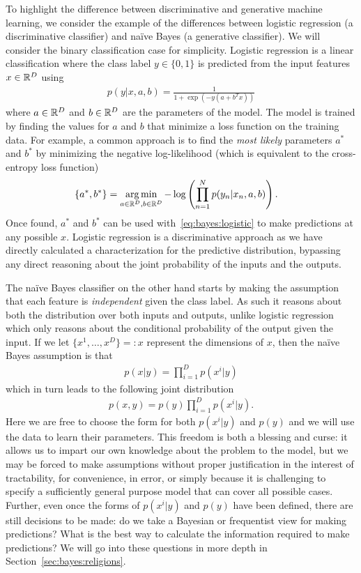 To highlight the difference between discriminative and generative machine learning, we consider the
example of the differences between logistic regression (a discriminative classifier) and na\"{i}ve Bayes 
(a generative classifier).  We will consider the binary classification case for simplicity.  Logistic regression is a linear
classification where the class label $y \in \{0,1\}$ is predicted from the input features $x \in \mathbb{R}^D$ using
\begin{align}
\label{eq:bayes:logistic}
p(y|x,a,b) = \frac{1}{1+\exp(-y(a+b^Tx))}
\end{align}
where $a \in \mathbb{R}^D$ and $b \in \mathbb{R}^D$ are the parameters of the model.  The model is trained by finding the values
for $a$ and $b$ that minimize a loss function on the training data.  For example, a common approach
is to find the \emph{most likely} parameters $a^*$ and $b^*$ by minimizing the negative log-likelihood
(which is equivalent to the cross-entropy loss function)
\begin{align}
\{a^*,b^*\} &= \operatorname*{arg\,min}_{a\in \mathbb{R}^D,b\in \mathbb{R}^D} -\log \left(\prod_{n=1}^{N} p(y_n|x_n,a,b)\right).
\end{align}
Once found, $a^*$ and $b^*$ can be used with~\eqref{eq:bayes:logistic} to make predictions at
any possible $x$.  Logistic regression is a discriminative approach as we have directly calculated
a characterization for the predictive distribution, bypassing any direct reasoning about the joint
probability of the inputs and the outputs.

The na\"{i}ve Bayes classifier on the other hand starts by making the assumption that each feature
is \emph{independent} given the class label.  As such it reasons about both the distribution over both
inputs and outputs, unlike logistic regression which only reasons about the conditional probability
of the output given the input.   If we let $\{x^1,\dots,x^D\} =: x$ represent the dimensions of $x$, then
the na\"{i}ve Bayes assumption is that
\begin{align}
p(x|y) = \prod_{i=1}^D p(x^i |y)
\end{align}
which in turn leads to the following joint distribution
\begin{align}
p(x,y) = p(y) \prod_{i=1}^D p(x^i |y).
\end{align}
Here we are free to choose the form for both $p(x^i |y)$ and $p(y)$ %
and we will use the data to learn their parameters.
This freedom is both a blessing and curse: it allows us to impart our own knowledge about the problem to
the model, but we may be forced to make assumptions without proper justification in the interest
of tractability, for convenience, in error, or simply because it is challenging to specify a sufficiently
general purpose model that can cover all possible cases.
Further, even once the forms of $p(x^i |y)$ and $p(y)$ have been defined, there are still decisions to be
made: do we take a Bayesian or frequentist view for making predictions? What is the best way
to calculate the information required to make predictions?  We will go into these questions in
more depth in Section~\ref{sec:bayes:religions}.


